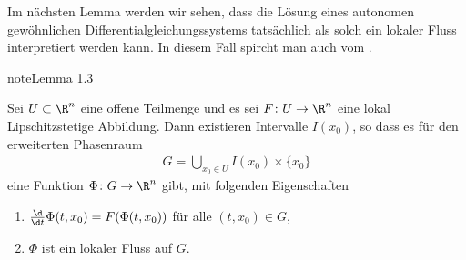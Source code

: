\documentclass[letterpaper,10pt,german]{jupyterBook}
\begin{document}
\sphinxAtStartPar
Im nächsten Lemma werden wir sehen, dass die Lösung eines autonomen gewöhnlichen Differentialgleichungssystems tatsächlich als solch ein lokaler Fluss interpretiert werden kann.
In diesem Fall spircht man auch vom .
\label{ode/fluesse:lemma-3}
\begin{sphinxadmonition}{note}{Lemma 1.3}



\sphinxAtStartPar
Sei \(U\subset\R^n\) eine offene Teilmenge und es sei \(F \colon U \rightarrow \R^n\) eine lokal Lipschitzstetige Abbildung.
Dann existieren Intervalle \(I(x_0)\), so dass es für den erweiterten Phasenraum
\begin{equation*}
\begin{split}G = \bigcup_{x_0\in U} I(x_0)\times\{x_0\}\end{split}
\end{equation*}
\sphinxAtStartPar
eine Funktion \(\Phi \colon G\rightarrow \R^n\) gibt, mit folgenden Eigenschaften
\begin{enumerate}
%
\item {} 
\sphinxAtStartPar
\(\frac{\d}{\d t} \Phi(t, x_0) = F(\Phi(t, x_0))\) für alle \((t,x_0)\in G\),

\item {} 
\sphinxAtStartPar
\(\Phi\) ist ein lokaler Fluss auf \(G\).

\end{enumerate}
\end{sphinxadmonition}
\end{document}
